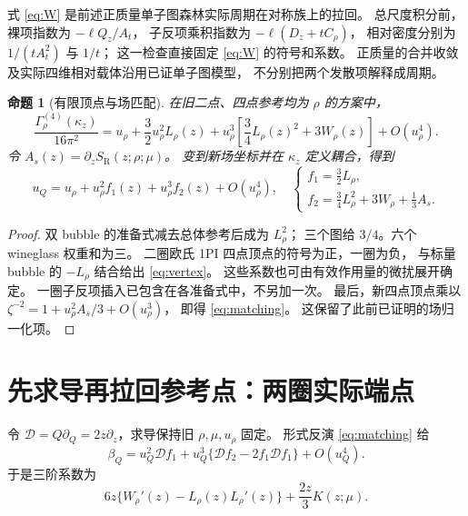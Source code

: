 \documentclass[11pt,a4paper]{ctexart}
\theoremstyle{cnplain}
\newtheorem{proposition}[theorem]{命题}
\theoremstyle{remark}\newtheorem{remark}[theorem]{注}
\newcommand{\SR}{S_{\mathrm R}}
\newcommand{\dd}{\mathcal D}
\begin{document}
式 \eqref{eq:W} 是前述正质量单子图森林实际周期在对称族上的拉回。
总尺度积分前，裸项指数为 $-\ell Q_z/A_t$，
子反项乘积指数为 $-\ell(D_z+tC_\rho)$，
相对密度分别为 $1/(tA_t^2)$ 与 $1/t$；
这一检查直接固定 \eqref{eq:W} 的符号和系数。
正质量的合并收敛及实际四维相对载体沿用已证单子图模型，
不分别把两个发散项解释成周期。

\begin{proposition}[有限顶点与场匹配]\label{prop:vertex}
在旧二点、四点参考均为 $\rho$ 的方案中，
\begin{equation}\label{eq:vertex}
 \frac{\Gamma_\rho^{(4)}(\kappa_z)}{16\pi^2}
 =u_\rho+\frac32u_\rho^2L_\rho(z)
    +u_\rho^3\left[\frac34L_\rho(z)^2+3W_\rho(z)\right]
    +O(u_\rho^4).
\end{equation}
令 $A_s(z)=\partial_z\SR(z;\rho;\mu)$。
变到新场坐标并在 $\kappa_z$ 定义耦合，得到
\begin{equation}\label{eq:matching}
 u_Q=u_\rho+u_\rho^2 f_1(z)+u_\rho^3 f_2(z)+O(u_\rho^4),
 \quad
 \begin{cases}
 f_1=\frac32L_\rho,\\
 f_2=\frac34L_\rho^2+3W_\rho+\frac13A_s.
 \end{cases}
\end{equation}
\end{proposition}
\begin{proof}
双 bubble 的准备式减去总体参考后成为 $L_\rho^2$；
三个图给 $3/4$。六个 wineglass 权重和为三。
二圈欧氏 1PI 四点顶点的符号为正，一圈为负，
与标量 bubble 的 $-L_\rho$ 结合给出 \eqref{eq:vertex}。
这些系数也可由有效作用量的微扰展开确定。
一圈子反项插入已包含在各准备式中，不另加一次。
最后，新四点顶点乘以
$\zeta^{-2}=1+u_\rho^2 A_s/3+O(u_\rho^3)$，
即得 \eqref{eq:matching}。
这保留了此前已证明的场归一化项。
\end{proof}

\section{先求导再拉回参考点：两圈实际端点}\label{sec:beta}
令 $\dd=Q\partial_Q=2z\partial_z$，求导保持旧 $\rho,\mu,u_\rho$ 固定。
形式反演 \eqref{eq:matching} 给
\begin{equation}\label{eq:beta-old}
 \beta_Q=u_Q^2\dd f_1+
 u_Q^3\{\dd f_2-2f_1\dd f_1\}+O(u_Q^4).
\end{equation}
于是三阶系数为
\begin{equation}\label{eq:beta-combination}
 6z\{W_\rho'(z)-L_\rho(z)L_\rho'(z)\}
                   +\frac{2z}{3}K(z;\mu).
\end{equation}
\end{document}
